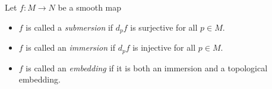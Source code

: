 \documentclass{ximera}
\begin{document}
    \begin{definition}
        Let $f : M \to N$ be a smooth map
        \begin{itemize}
            \item $f$ is called a \emph{submersion} if $d_p f$ is surjective for all $p \in M$.
            \item $f$ is called an \emph{immersion} if $d_p f$ is injective for all $p \in M$.
            \item $f$ is called an \emph{embedding} if it is both an immersion and a topological embedding.
        \end{itemize}
    \end{definition}
\end{document}
